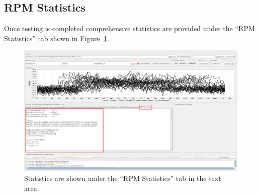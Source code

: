 \documentclass[titlepage, letterpaper, 12pt]{article}
\begin{document}
\subsection{RPM Statistics}
Once testing is completed comprehensive statistics are provided under the ``RPM Statistics'' tab shown in Figure~\ref{fig:time-series-analysis-tool-tsatrpmstats}.

\begin{figure}[H]
	\centering
	\includegraphics[width=\textwidth]{"pictures/Time Series Analysis Tool: TSAT_RPMStats"}
	\caption{Statistics are shown under the ``RPM Statistics'' tab in the text area.}
	\label{fig:time-series-analysis-tool-tsatrpmstats}
\end{figure}
\end{document}
